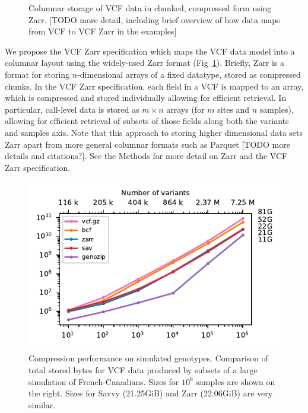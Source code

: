 \documentclass[a4paper,num-refs]{oup-contemporary}
\begin{document}
\begin{figure}
\resizebox{225pt}{!}{}
\caption{Columnar storage of VCF data in chunked, compressed form using Zarr.
[TODO more detail, including brief overview of how data maps from 
VCF to VCF Zarr in the examples]
\label{fig-data-model}}
\end{figure}

We propose the VCF Zarr specification which maps the 
VCF data model into a columnar layout using the
widely-used Zarr format (Fig~\ref{fig-data-model}). 
Briefly, Zarr is a format 
for storing $n$-dimensional arrays of a fixed datatype, stored as 
compressed chunks. In the VCF Zarr specification, 
each field in a VCF is mapped to an array, which is compressed 
and stored individually allowing for efficient retrieval. 
In particular, call-level data is stored as $m \times n$ arrays
(for $m$ sites and $n$ samples), allowing for efficient 
retrieval of subsets of those fields along both the 
variants and samples axis.
Note that this approach to storing higher dimensional data
sets Zarr apart from more general columnar formats 
such as Parquet [TODO more details and citations?].
See the Methods for more detail on Zarr and the VCF Zarr
specification.

\begin{figure}
\begin{center}
\includegraphics[]{figures/data-scaling}
\end{center}
\caption{Compression performance on simulated genotypes.
Comparison of total stored bytes for VCF data produced 
by subsets of a large simulation of French-Canadians.
Sizes for $10^6$ samples are shown on the right. Sizes 
for Savvy (21.25GiB) and Zarr (22.06GiB) are very similar.
\label{fig-data-storage}}
\end{figure}
\end{document}
